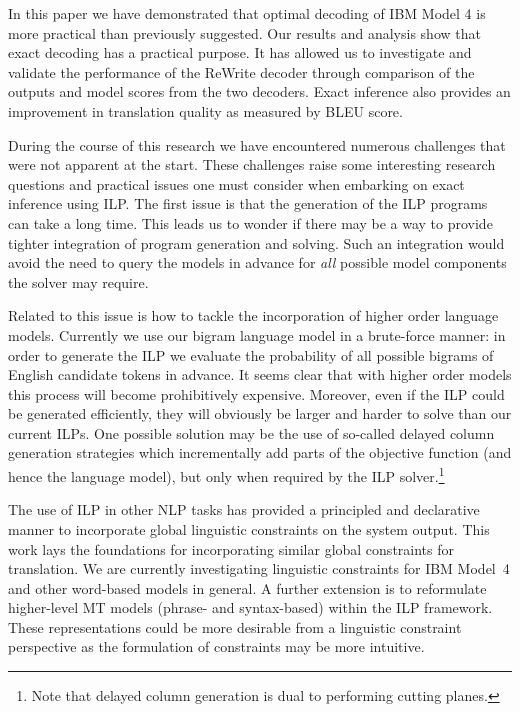 In this paper we have demonstrated that optimal decoding of IBM Model
4 is more practical than previously suggested.  Our results and
analysis show that exact decoding has a practical purpose.  It has
allowed us to investigate and validate the performance of the ReWrite
decoder through comparison of the outputs and model scores from the
two decoders.  Exact inference also provides an improvement in
translation quality as measured by BLEU score.

During the course of this research we have encountered numerous
challenges that were not apparent at the start.  These challenges
raise some interesting research questions and practical issues one
must consider when embarking on exact inference using ILP.  The first
issue is that the generation of the ILP programs can take a long time.
This leads us to wonder if there may be a way to provide tighter
integration of program generation and solving.  Such an integration
would avoid the need to query the models in advance for \emph{all}
possible model components the solver may require.

Related to this issue is how to tackle the incorporation of higher
order language models. Currently we use our bigram language model in a
brute-force manner: in order to generate the ILP we evaluate the
probability of all possible bigrams of English candidate tokens in
advance. It seems clear that with higher order models this process
will become prohibitively expensive. Moreover, even if the ILP could
be generated efficiently, they will obviously be larger and harder to
solve than our current ILPs. One possible solution may be the use of
so-called delayed column generation strategies which incrementally add
parts of the objective function (and hence the language model), but
only when required by the ILP solver.\footnote{Note that delayed
  column generation is dual to performing cutting planes.}

The use of ILP in other NLP tasks has provided a principled and
declarative manner to incorporate global linguistic constraints on the
system output.  This work lays the foundations for incorporating
similar global constraints for translation.  We are currently
investigating linguistic constraints for IBM Model~4 and other
word-based models in general.  A further extension is to reformulate
higher-level MT models (phrase- and syntax-based) within the ILP
framework.  These representations could be more desirable from a
linguistic constraint perspective as the formulation of constraints
may be more intuitive.


